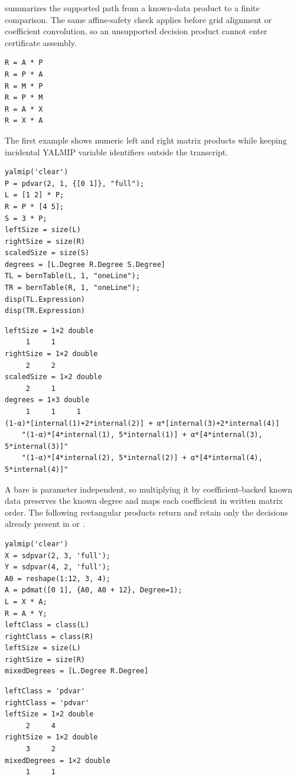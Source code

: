  summarizes the supported path from a known-data product to a finite comparison. The same affine-safety check applies before grid alignment or coefficient convolution, so an unsupported decision product cannot enter certificate assembly.

\syntaxhead
\begin{lstlisting}[style=dpsyntax]
R = A * P
R = P * A
R = M * P
R = P * M
R = A * X
R = X * A
\end{lstlisting}

The first example shows numeric left and right matrix products while keeping incidental YALMIP variable identifiers outside the transcript.

\begin{lstlisting}[style=dpmatlab]
yalmip('clear')
P = pdvar(2, 1, {[0 1]}, "full");
L = [1 2] * P;
R = P * [4 5];
S = 3 * P;
leftSize = size(L)
rightSize = size(R)
scaledSize = size(S)
degrees = [L.Degree R.Degree S.Degree]
TL = bernTable(L, 1, "oneLine");
TR = bernTable(R, 1, "oneLine");
disp(TL.Expression)
disp(TR.Expression)
\end{lstlisting}

\begin{lstlisting}[style=dpwideoutput]
leftSize = 1×2 double
     1     1
rightSize = 1×2 double
     2     2
scaledSize = 1×2 double
     2     1
degrees = 1×3 double
     1     1     1
(1-α)*[internal(1)+2*internal(2)] + α*[internal(3)+2*internal(4)]
    "(1-α)*[4*internal(1), 5*internal(1)] + α*[4*internal(3), 5*internal(3)]"
    "(1-α)*[4*internal(2), 5*internal(2)] + α*[4*internal(4), 5*internal(4)]"
\end{lstlisting}

A bare  is parameter independent, so multiplying it by coefficient-backed known data preserves the known degree and maps each coefficient in written matrix order. The following rectangular products return  and retain only the decisions already present in  or .

\begin{lstlisting}[style=dpmatlab]
yalmip('clear')
X = sdpvar(2, 3, 'full');
Y = sdpvar(4, 2, 'full');
A0 = reshape(1:12, 3, 4);
A = pdmat([0 1], {A0, A0 + 12}, Degree=1);
L = X * A;
R = A * Y;
leftClass = class(L)
rightClass = class(R)
leftSize = size(L)
rightSize = size(R)
mixedDegrees = [L.Degree R.Degree]
\end{lstlisting}

\begin{lstlisting}[style=dpoutput]
leftClass = 'pdvar'
rightClass = 'pdvar'
leftSize = 1×2 double
     2     4
rightSize = 1×2 double
     3     2
mixedDegrees = 1×2 double
     1     1
\end{lstlisting}

